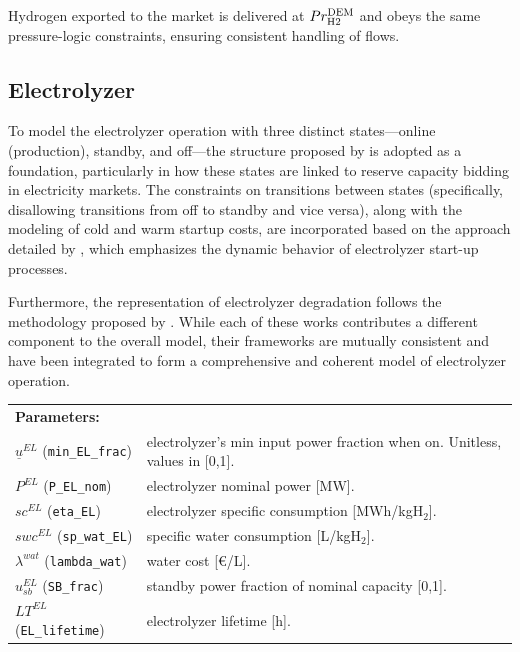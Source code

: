 \documentclass{article}
\begin{document}
Hydrogen exported to the market is delivered at \(Pr^{\rm DEM}_{\rm H2}\) and obeys the same pressure-logic constraints, ensuring consistent handling of flows.

\subsection{Electrolyzer}
\label{SEC:Electrolyzer}

To model the electrolyzer operation with three distinct states—online (production), standby, and off—the structure proposed by \cite{johnsen2025} is adopted as a foundation, particularly in how these states are linked to reserve capacity bidding in electricity markets. The constraints on transitions between states (specifically, disallowing transitions from off to standby and vice versa), along with the modeling of cold and warm startup costs, are incorporated based on the approach detailed by \cite{Zheng2022}, which emphasizes the dynamic behavior of electrolyzer start-up processes. 

Furthermore, the representation of electrolyzer degradation follows the methodology proposed by \cite{Matute2021}. While each of these works contributes a different component to the overall model, their frameworks are mutually consistent and have been integrated to form a comprehensive and coherent model of electrolyzer operation. \\

\noindent
\begin{tabularx}{\textwidth}{@{}l X@{}}
    \textbf{Parameters:} \\
    $\underline{u}^{EL}$ (\verb|min_EL_frac|)
      & electrolyzer's min input power fraction when on.
        Unitless, values in [0,1]. \\
    $P^{EL}$ (\verb|P_EL_nom|)
      & electrolyzer nominal power [MW]. \\
    $sc^{EL}$ (\verb|eta_EL|)
      & electrolyzer specific consumption [MWh/kgH$_2$]. \\
    $swc^{EL}$ (\verb|sp_wat_EL|)
      & specific water consumption [L/kgH$_2$]. \\
    $\lambda^{wat}$ (\verb|lambda_wat|)
      & water cost [\euro{}/L]. \\
    $u_{sb}^{EL}$ (\verb|SB_frac|)
      & standby power fraction of nominal capacity [0,1]. \\
    $LT^{EL}$ (\verb|EL_lifetime|)
      & electrolyzer lifetime [h]. \\
\end{tabularx}
\end{document}

